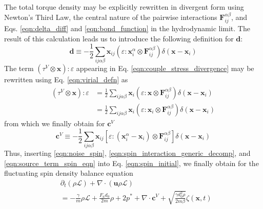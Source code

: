 \documentclass[%
 reprint,
superscriptaddress,
longbibliography,
 amsmath,amssymb,
 prl,
 citeautoscript,
]{revtex4-1}
\begin{document}
The total torque density may be explicitly rewritten in divergent form using Newton's Third Law, the central nature of the pairwise interactions ${\boldsymbol F}_{ij}^{\alpha \beta}$, and Eqs. \ref{eqn:delta_diff} and \ref{eqn:bond_function} in the hydrodynamic limit. The result of this calculation leads us to introduce the following definition for ${\boldsymbol d}$:
\begin{equation}
{\boldsymbol d} \equiv - \frac{1}{2} \sum_{ij\alpha\beta} {\boldsymbol x}_{ij} \left( \varepsilon : {\boldsymbol x}_i^{\alpha} \otimes {\boldsymbol F}_{ij}^{\alpha\beta} \right) \delta \left( {\boldsymbol x} - {\boldsymbol x}_i \right)
\label{eqn:d_definition}
\end{equation}
The term $\left( \tau^V \otimes {\boldsymbol x} \right) : \varepsilon$ appearing in Eq. \ref{eqn:couple_stress_divergence} may be rewritten using Eq. \ref{eqn:virial_defn} as
\begin{equation}
\begin{split}
\left( \tau^V \otimes {\boldsymbol x} \right) : \varepsilon &= \frac{1}{2} \sum_{ij\alpha\beta} {\boldsymbol x}_i \left( \varepsilon : {\boldsymbol x} \otimes {\boldsymbol F}_{ij}^{\alpha\beta} \right) \delta \left( {\boldsymbol x} - {\boldsymbol x}_i \right) \\
&= \frac{1}{2} \sum_{ij\alpha\beta} {\boldsymbol x}_i \left( \varepsilon : {\boldsymbol x}_i \otimes {\boldsymbol F}_{ij}^{\alpha\beta} \right) \delta \left( {\boldsymbol x} - {\boldsymbol x}_i \right)
\end{split}
\end{equation}
from which we finally obtain for ${\boldsymbol c}^V$
\begin{equation}
{\boldsymbol c}^V \equiv - \frac{1}{2} \sum_{ij\alpha\beta} {\boldsymbol x}_{ij} \left[ \varepsilon : \left( {\boldsymbol x}_i^{\alpha} - {\boldsymbol x}_i \right) \otimes {\boldsymbol F}_{ij}^{\alpha\beta} \right] \delta \left( {\boldsymbol x} - {\boldsymbol x}_i \right)
\label{eqn:couple_stress_defn}
\end{equation}
Thus, inserting \ref{eqn:noise_spin}, \ref{eqn:spin_interaction_generic_decomp}, and \ref{eqn:source_term_spin_eqn} into Eq. \ref{eqn:spin_initial}, we finally obtain for the fluctuating spin density balance equation
\begin{equation}
\begin{split}
&\partial_t \left( \rho \mathcal{L} \right) + \nabla \cdot \left( {\boldsymbol u} \rho \mathcal{L} \right) \\
&= - \frac{\gamma}{m} \rho \mathcal{L} + \frac{F_a d_0}{2m} \rho + 2 p^* + \nabla \cdot {\boldsymbol c}^V + \sqrt{\frac{\gamma d_0^2 \rho}{2 m \beta}} \zeta \left( {\boldsymbol x}, t \right)
\end{split}
\label{eqn:spin_fluctuating}
\end{equation}
\end{document}
